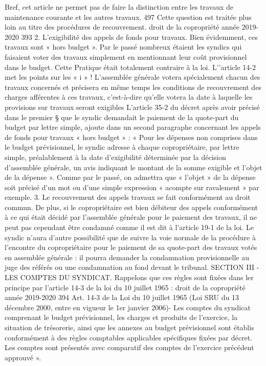 Bref, cet article ne permet pas de faire la distinction entre les travaux de maintenance courante et les autres travaux.
497 Cette question est traitée plus loin au titre des procédures de recouvrement.
droit de la copropriété année 2019-2020
393
2. L’exigibilité des appels de fonds pour travaux.
Bien évidemment, ces travaux sont « hors budget ». Par le passé nombreux étaient les syndics qui faisaient voter des travaux simplement en mentionnant leur coût provisionnel dans le budget. Cette Pratique était totalement contraire à la loi. L’’article 14-2 met les points sur les « i » !
L'assemblée générale votera spécialement chacun des travaux concernés et précisera en même temps les conditions de recouvrement des charges afférentes à ces travaux, c'est-à-dire qu’elle votera la date à laquelle les provisions sur travaux seront exigibles
L’article 35-2 du décret après avoir précisé dans le premier § que le syndic demandait le paiement de la quote-part du budget par lettre simple, ajoute dans un second paragraphe concernant les appels de fonds pour travaux « hors budget » :
« Pour les dépenses non comprises dans le budget prévisionnel, le syndic adresse à chaque copropriétaire, par lettre simple, préalablement à la date d'exigibilité déterminée par la décision d'assemblée générale, un avis indiquant le montant de la somme exigible et l'objet de la dépense ».
Comme par le passé, on admettra que « l’objet » de la dépense soit précisé d’un mot ou d’une simple expression « acompte sur ravalement » par exemple.
3. Le recouvrement des appels travaux se fait conformément au droit commun.
De plus, si le copropriétaire est bien débiteur des appels conformément à ce qui était décidé par l'assemblée générale pour le paiement des travaux, il ne peut pas cependant être condamné comme il est dit à l'article 19-1 de la loi.
Le syndic n'aura d'autre possibilité que de suivre la voie normale de la procédure à l'encontre du copropriétaire pour le paiement de sa quote-part des travaux votés en assemblée générale : il pourra demander la condamnation provisionnelle au juge des référés ou une condamnation au fond devant le tribunal.
SECTION III - LES COMPTES DU SYNDICAT.
Rappelons que ces règles sont fixées dans ler principe par l’article 14-3 de la loi du 10 juillet 1965 :
droit de la copropriété année 2019-2020
394
Art. 14-3 de la Loi du 10 juillet 1965 (Loi SRU du 13 décembre 2000, entre en vigueur le 1er janvier 2006)-
Les comptes du syndicat comprenant le budget prévisionnel, les charges et produits de l’exercice, la situation de trésorerie, ainsi que les annexes au budget prévisionnel sont établis conformément à des règles comptables applicables spécifiques fixées par décret. Les comptes sont présentés avec comparatif des comptes de l’exercice précédent approuvé ».
